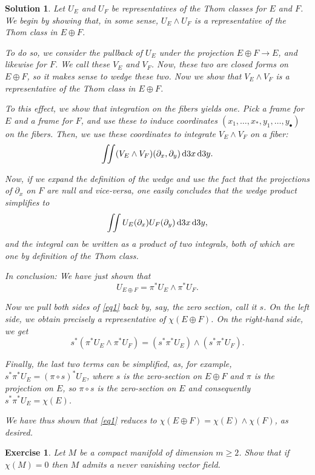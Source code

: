 \documentclass{article}
\newtheorem{ex}{Exercise}
\theoremstyle{nonumberplain}
\newtheorem{sol}{Solution}
\begin{document}
\begin{sol}
Let $U_E$ and $U_F$ be representatives of the Thom classes for $E$ and $F$. We begin by showing that, in some sense, $U_E \wedge U_F$ is a representative of the Thom class in $E \oplus F$.

To do so, we consider the pullback of $U_E$ under the projection $E \oplus F \to E$, and likewise for $F$. We call these $V_E$ and $V_F$. Now, these two are closed forms on $E \oplus F$, so it makes sense to wedge these two. Now we show that $V_E \wedge V_F$ is a representative of the Thom class in $E \oplus F$.

To this effect, we show that integration on the fibers yields one. Pick a frame for $E$ and a frame for $F$, and use these to induce coordinates $(x_1, \dots, x_*, y_1, \dots, y_\bullet)$ on the fibers. Then, we use these coordinates to integrate $V_E \wedge V_F$ on a fiber:
\[\iint (V_E \wedge V_F)(\partial_x,\partial_y) \dl3x \dl3y.\]

Now, if we expand the definition of the wedge and use the fact that the projections of $\partial_x$ on $F$ are null and vice-versa, one easily concludes that the wedge product simplifies to
\[\iint U_E(\partial_x) U_F(\partial_y) \dl3x \dl3y,\]
and the integral can be written as a product of two integrals, both of which are one by definition of the Thom class.

In conclusion: We have just shown that
\begin{equation}\label{eq1}
U_{E \oplus F} = \pi^* U_E \wedge \pi^* U_F.
\end{equation}

Now we pull both sides of \eqref{eq1} back by, say, the zero section, call it $s$. On the left side, we obtain precisely a representative of $\chi(E \oplus F)$. On the right-hand side, we get
\[s^*(\pi^* U_E \wedge \pi^* U_F) = (s^* \pi^* U_E) \wedge (s^* \pi^* U_F).\]

Finally, the last two terms can be simplified, as, for example, $s^* \pi^* U_E = (\pi \circ s)^* U_E$, where $s$ is the zero-section on $E \oplus F$ and $\pi$ is the projection on $E$, so $\pi \circ s$ is the zero-section on $E$ and consequently $s^* \pi^* U_E = \chi(E)$. 

We have thus shown that \eqref{eq1} reduces to $\chi(E \oplus F) = \chi(E) \wedge \chi(F)$, as desired.
\end{sol}

\begin{ex}
Let $M$ be a compact manifold of dimension $m \geq 2$. Show that if $\chi(M) = 0$ then $M$ admits a never vanishing vector field.
\end{ex}
\end{document}
